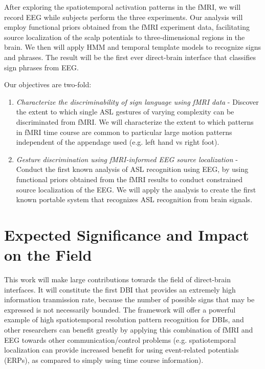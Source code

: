 \documentclass{proposal}
\begin{document}
After exploring the spatiotemporal activation patterns in the fMRI, we will record EEG while subjects perform the three experiments. Our analysis will employ functional priors obtained from the fMRI experiment data, facilitating source localization of the scalp potentials to three-dimensional regions in the brain. We then will apply HMM and temporal template models to recognize signs and phrases. The result will be the first ever direct-brain interface that classifies sign phrases from EEG.

Our objectives are two-fold:
\begin{enumerate}
\item \textit{Characterize the discriminability of sign language using fMRI data} - Discover the extent to which single ASL gestures of varying complexity can be discriminated from fMRI. We will characterize the extent to which patterns in fMRI time course are common to particular large motion patterns independent of the appendage used (e.g. left hand vs right foot).
\item \textit{Gesture discrimination using fMRI-informed EEG source localization} - Conduct the first known analysis of ASL recognition using EEG, by using functional priors obtained from the fMRI results to conduct constrained source localization of the EEG. We will apply the analysis to create the first known portable system that recognizes ASL recognition from brain signals.
\end{enumerate}

\section{Expected Significance and Impact on the
Field}
This work will make large contributions towards the field of direct-brain interfaces. It will constitute the first DBI that provides an extremely high information tranmission rate, because the number of possible signs that may be expressed is not necessarily bounded. The framework will offer a powerful example of high spatiotemporal resolution pattern recognition for DBIs, and other researchers can benefit greatly by applying this combination of fMRI and EEG towards other communication/control problems (e.g. spatiotemporal localization can provide increased benefit for using event-related potentials (ERPs), as compared to simply using time course information).
\end{document}
